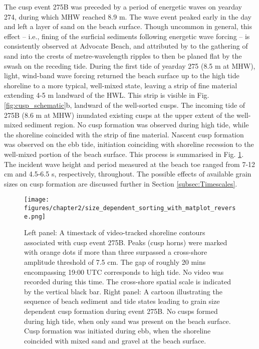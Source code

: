 The cusp event 275B was preceded by a period of energetic waves on yearday 274, during which MHW reached 8.9 m. The wave event peaked early in the day and left a layer of sand on the beach surface. Though uncommon in general, this effect -- i.e., fining of the surficial sediments following energetic wave forcing -- is consistently observed at Advocate Beach, and attributed by \citet{Hay_etal2014} to the gathering of sand into the crests of metre-wavelength ripples to then be planed flat by the swash on the receding tide. During the first tide of yearday 275 (8.5 m at MHW), light, wind-band wave forcing returned the beach surface up to the high tide shoreline to a more typical, well-mixed state, leaving a strip of fine material extending 4-5 m landward of the HWL. This strip is visible in Fig. \ref{fig:cusp_schematic}b, landward of the well-sorted cusps. The incoming tide of 275B (8.6 m at MHW) inundated existing cusps at the upper extent of the well-mixed sediment region. No cusp formation was observed during high tide, while the shoreline coincided with the strip of fine material. Nascent cusp formation was observed on the ebb tide, initiation coinciding with shoreline recession to the well-mixed portion of the beach surface. This process is summarised in Fig. \ref{fig:yd275B_cusps}. The incident wave height and period measured at the beach toe ranged from 7-12 cm and 4.5-6.5 s, respectively, throughout. The possible effects of available grain sizes on cusp formation are discussed further in Section \ref{subsec:Timescales}.   

\begin{figure}[tbp]%
 	\texttt{[image: figures/chapter2/size\_dependent\_sorting\_with\_matplot\_reverse.png]}
	\caption[Dependence of cusp formation on surficial grain size: timestacked shoreline contours and schematic]{Left panel: A timestack of video-tracked shoreline contours associated with cusp event 275B. Peaks (cusp horns) were marked with orange dots if more than three surpassed a cross-shore amplitude threshold of 7.5 cm. The gap of roughly 20 mins encompassing 19:00 UTC corresponds to high tide. No video was recorded during this time. The cross-shore spatial scale is indicated by the vertical black bar. Right panel: A cartoon illustrating the sequence of beach sediment and tide states leading to grain size dependent cusp formation during event 275B. No cusps formed during high tide, when only sand was present on the beach surface. Cusp formation was initiated during ebb, when the shoreline coincided with mixed sand and gravel at the beach surface.}
	\label{fig:yd275B_cusps}
\end{figure}



